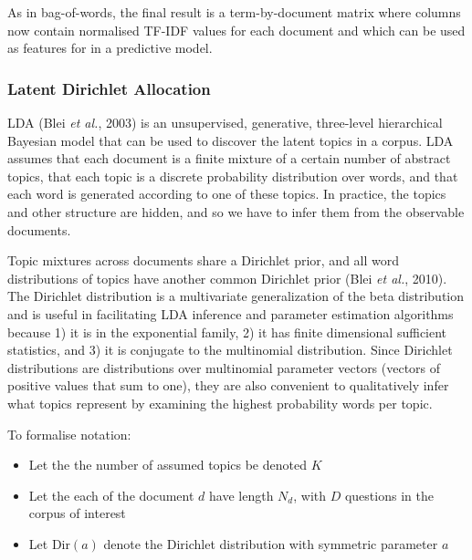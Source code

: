 \documentclass[11pt,preprint, authoryear]{article}
\begin{document}
As in bag-of-words, the final result is a term-by-document matrix where
columns now contain normalised TF-IDF values for each document and which
can be used as features for in a predictive model.

\subsubsection{\texorpdfstring{Latent Dirichlet Allocation
\label{lda}}{Latent Dirichlet Allocation }}\label{latent-dirichlet-allocation}

LDA (Blei \emph{et al.}, 2003) is an unsupervised, generative,
three-level hierarchical Bayesian model that can be used to discover the
latent topics in a corpus. LDA assumes that each document is a finite
mixture of a certain number of abstract topics, that each topic is a
discrete probability distribution over words, and that each word is
generated according to one of these topics. In practice, the topics and
other structure are hidden, and so we have to infer them from the
observable documents.

Topic mixtures across documents share a Dirichlet prior, and all word
distributions of topics have another common Dirichlet prior (Blei
\emph{et al.}, 2010). The Dirichlet distribution is a multivariate
generalization of the beta distribution and is useful in facilitating
LDA inference and parameter estimation algorithms because 1) it is in
the exponential family, 2) it has finite dimensional sufficient
statistics, and 3) it is conjugate to the multinomial distribution.
Since Dirichlet distributions are distributions over multinomial
parameter vectors (vectors of positive values that sum to one), they are
also convenient to qualitatively infer what topics represent by
examining the highest probability words per topic.

\newpage

To formalise notation:


\begin{itemize}
\item
  Let the the number of assumed topics be denoted \(K\)
\item
  Let the each of the document \(d\) have length \(N_d\), with \(D\)
  questions in the corpus of interest
\item
  Let \(\text{Dir}(a)\) denote the Dirichlet distribution with symmetric
  parameter \(a\)
\end{itemize}
\end{document}
